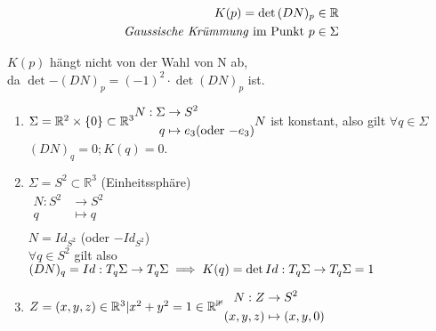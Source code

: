 \documentclass[../main.tex]{subfiles}
\begin{document}
\begin{definition}
    \begin{align*}
        K(p) = \det{(DN)_{p}}\in \mathbb{R}\\
        \text{\emph{Gaussische Krümmung} im Punkt } p \in \Sigma
    \end{align*}
\end{definition}
\begin{remark}
    $K(p)$ hängt nicht von der Wahl von N ab, \\da $\det{-(DN)_{p}} = (-1)^{2} \cdot \det{(DN)_{p}}$ ist.
\end{remark}
\begin{example}
    \begin{enumerate} \leavevmode
        \item $\Sigma = \mathbb{R}^{2} \times \{0\} \subset \mathbb{R}^{3}\\
        \begin{aligned}
            N : \Sigma & \to S^{2}\\
            q & \mapsto e_{3} \text{(oder $-e_{3}$)}\\
        \end{aligned}\\
        N$ ist konstant, also gilt $\forall q \in \Sigma$ 
        $(DN)_{q} = 0; K(q) = 0$.
        \item $\Sigma = S^{2} \subset \mathbb{R}^{3}$ (Einheitssphäre)\\
        $\begin{aligned}
            N: S^{2} &\to S^{2}\\
            q &\mapsto q\\
        \end{aligned}$\\
        $N = Id_{S^{2}}$ (oder $-Id_{S^{2}}$)\\
        $\forall q \in S^{2}$ gilt also $(DN)_{q} = Id : T_{q}\Sigma \to T_{q}\Sigma\\
        \implies K(q) = \det{Id: T_{q}\Sigma \to T_{q}\Sigma} = 1$
        \item $Z = {(x,y,z)\in \mathbb{R}^{3} | x^{2} + y^{2} = 1}\in \mathbb{R^{3}}\\
        \begin{aligned}
            N : Z &\to S^{2}\\
            (x,y,z) &\mapsto (x,y,0)\\
        \end{aligned}$\\

\end{enumerate}
\end{example}
\end{document}
